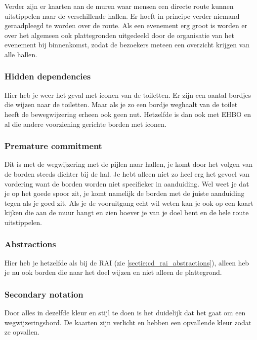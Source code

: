 Verder zijn er kaarten aan de muren waar mensen een directe route kunnen uitstippelen naar de verschillende hallen. Er hoeft in principe verder niemand geraadpleegd te worden over de route. Als een evenement erg groot is worden er over het algemeen ook plattegronden uitgedeeld door de organisatie van het evenement bij binnenkomst, zodat de bezoekers meteen een overzicht krijgen van alle hallen.


\subsubsection{Hidden dependencies}

Hier heb je weer het geval met iconen van de toiletten. Er zijn een aantal bordjes die wijzen naar de toiletten. Maar als je zo een bordje weghaalt van de toilet heeft de bewegwijzering erheen ook geen nut. Hetzelfde is dan ook met EHBO en al die andere voorziening gerichte borden met iconen.


\subsubsection{Premature commitment}

Dit is met de wegwijzering met de pijlen naar hallen, je komt door het volgen van de borden steeds dichter bij de hal. Je hebt alleen niet zo heel erg het gevoel van vordering want de borden worden niet specifieker in aanduiding. Wel weet je dat je op het goede spoor zit, je komt namelijk de borden met de juiste aanduiding tegen als je goed zit. Als je de vooruitgang echt wil weten kan je ook op een kaart kijken die aan de muur hangt en zien hoever je van je doel bent en de hele route uitstippelen.


\subsubsection{Abstractions}

Hier heb je hetzelfde als bij de RAI (zie \ref{sectie:cd_rai_abstractions}), alleen heb je nu ook borden die naar het doel wijzen en niet alleen de plattegrond.


\subsubsection{Secondary notation}

Door alles in dezelfde kleur en stijl te doen is het duidelijk dat het gaat om een wegwijzeringsbord. De kaarten zijn verlicht en hebben een opvallende kleur zodat ze opvallen.


